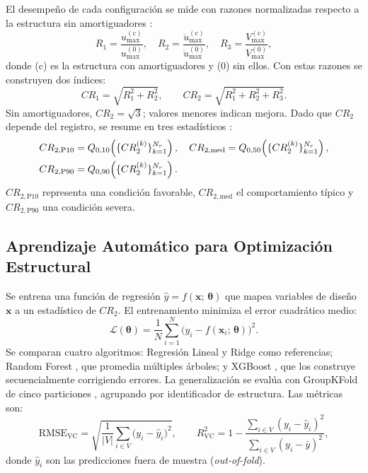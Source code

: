 \documentclass[preprint,12pt,authoryear]{elsarticle}
\newcommand{\CR}[1]{CR_{2,\text{#1}}}
\newcommand{\RMSE}{\mathrm{RMSE_{VC}}}
\newcommand{\Rsq}{R^{2}_{\mathrm{VC}}}
\begin{document}
El desempeño de cada configuración se mide con razones normalizadas respecto a
la estructura sin amortiguadores \citep{Namorado2024, Jarrahi2020jbe, Mualla2002}:
\begin{equation}
    R_1 = \frac{u_{\max}^{(\mathrm{c})}}{u_{\max}^{(0)}}, \quad
    R_2 = \frac{\ddot{u}_{\max}^{(\mathrm{c})}}{\ddot{u}_{\max}^{(0)}}, \quad
    R_3 = \frac{V_{\max}^{(\mathrm{c})}}{V_{\max}^{(0)}},
    \label{eq:R_individual}
\end{equation}
donde (c) es la estructura con amortiguadores y (0) sin ellos. Con estas razones
se construyen dos índices:
\begin{equation}
    CR_1 = \sqrt{R_1^2 + R_2^2}, \qquad
    CR_2 = \sqrt{R_1^2 + R_2^2 + R_3^2}.
    \label{eq:CR}
\end{equation}
Sin amortiguadores, $CR_2 = \sqrt{3}$; valores menores indican mejora. Dado
que $CR_2$ depende del registro, se resume en tres estadísticos
\citep{Kazemi2022}:
\begin{align}
    \CR{P10} &= Q_{0{,}10}\!\left(\{CR_2^{(k)}\}_{k=1}^{N_r}\right), \quad
    \CR{med}  = Q_{0{,}50}\!\left(\{CR_2^{(k)}\}_{k=1}^{N_r}\right), \notag\\
    \CR{P90} &= Q_{0{,}90}\!\left(\{CR_2^{(k)}\}_{k=1}^{N_r}\right).
    \label{eq:CR2stats}
\end{align}
$\CR{P10}$ representa una condición favorable, $\CR{med}$ el comportamiento
típico y $\CR{P90}$ una condición severa.

\subsection{Aprendizaje Automático para Optimización Estructural}
\label{sec:theory:ml}

Se entrena una función de regresión $\hat{y} = f(\bm{x};\,\bm{\theta})$ que
mapea variables de diseño $\bm{x}$ a un estadístico de $CR_2$. El entrenamiento
minimiza el error cuadrático medio:
\begin{equation}
    \mathcal{L}(\bm{\theta}) = \frac{1}{N}\sum_{i=1}^{N}
    \bigl(y_i - f(\bm{x}_i;\,\bm{\theta})\bigr)^2.
    \label{eq:mse}
\end{equation}
Se comparan cuatro algoritmos: Regresión Lineal y Ridge como referencias;
Random Forest \citep{Breiman2001}, que promedia múltiples árboles; y XGBoost
\citep{Chen2016}, que los construye secuencialmente corrigiendo errores. La
generalización se evalúa con GroupKFold de cinco particiones \citep{Kazemi2022},
agrupando por identificador de estructura. Las métricas son:
\begin{equation}
    \RMSE = \sqrt{\frac{1}{|V|}\sum_{i \in V}\bigl(y_i - \hat{y}_i\bigr)^2},
    \qquad
    \Rsq  = 1 - \frac{\sum_{i \in V}(y_i - \hat{y}_i)^2}
                      {\sum_{i \in V}(y_i - \bar{y})^2},
    \label{eq:metrics}
\end{equation}
donde $\hat{y}_i$ son las predicciones fuera de muestra (\textit{out-of-fold}).
\end{document}
